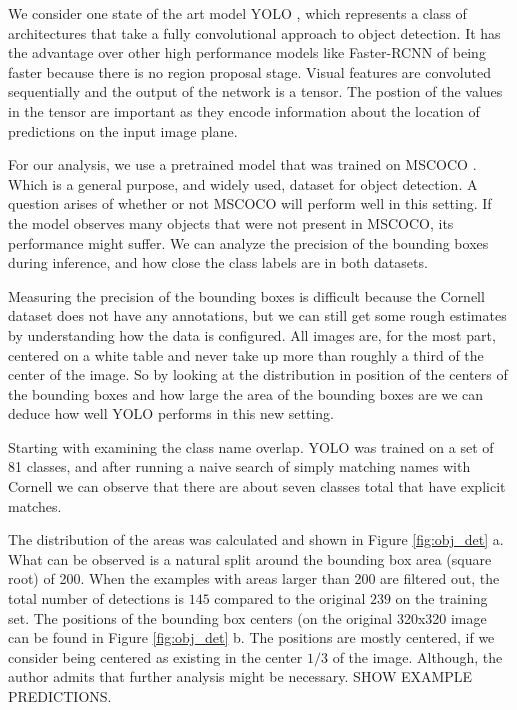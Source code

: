 \documentclass{article}
\begin{document}
We consider one state of the art model YOLO \cite{redmon16}, which represents a class
of architectures that take a fully convolutional approach to object detection. It has
the advantage over other high performance models like Faster-RCNN \cite{girshick15} of
being faster because there is no region proposal stage. Visual features are convoluted
sequentially and the output of the network is a tensor. The postion of the values in the
tensor are important as they encode information about the location of predictions on the
input image plane.

For our analysis, we use a pretrained model that was trained on MSCOCO \cite{lin14}. Which
is a general purpose, and widely used, dataset for object detection. A question arises of
whether or not MSCOCO will perform well in this setting. If the model
observes many objects that were not present in MSCOCO, its performance might suffer.
We can analyze the precision of the bounding boxes during inference, and how close
the class labels are in both datasets.

Measuring the precision of the bounding boxes is difficult because the Cornell dataset
does not have any annotations, but we can still get some rough estimates by understanding
how the data is configured. All images are, for the most part, centered on a white table
and never take up more than roughly a third of the center of the image. So by looking
at the distribution in position of the centers of the bounding boxes and how large the
area of the bounding boxes are we can deduce how well YOLO performs in this new setting.

Starting with examining the class name overlap. YOLO was trained on a set of 81 classes,
and after running a naive search of simply matching names with Cornell we can observe
that there are about seven classes total that have explicit matches.

The distribution of the areas was calculated and shown in Figure \ref{fig:obj_det} a.
What can be observed is a natural split around the bounding box area (square root) of
200. When the examples with areas larger than 200 are filtered out, the total number
of detections is $145$ compared to the original $239$ on the training set. The positions
of the bounding box centers (on the original 320x320 image can be found in Figure
\ref{fig:obj_det} b. The positions are mostly centered, if we consider being centered
as existing in the center $1/3$ of the image. Although, the author admits
that further analysis might be necessary. SHOW EXAMPLE PREDICTIONS.
\end{document}
